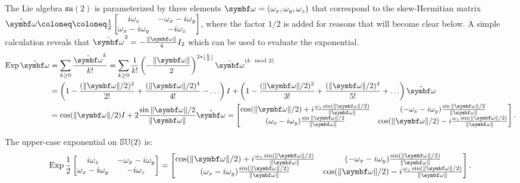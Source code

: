 The Lie algebra $\mathfrak{su}(2)$ is parameterized by three elements $\bomega = (\omega_x, \omega_y, \omega_z)$ that correspond to the skew-Hermitian matrix $\hat \bomega \coloneq \coloneq \frac{1}{{2}} \begin{bmatrix}
    i \omega_z            & -\omega_x - i \omega_y \\
    \omega_x - i \omega_y & -i \omega_z
  \end{bmatrix}$, where the factor $1/2$ is added for reasons that will become clear below. A simple calculation reveals that $\hat \bomega^2 =  -\frac{\| \bomega \|}{4} I_2$ which can be used to evaluate the exponential.
\begin{equation*}
  \begin{aligned}
    \Exp \hat \bomega
     & = \sum_{k \geq 0} \frac{\hat \bomega^k}{k!} = \sum_{k \geq 0} \frac{1}{k!} \left(-\frac{\| \bomega \|}{2} \right)^{2 * \lfloor \frac{k}{2} \rfloor} \hat \bomega^{(k \mod 2)}                      \\
     & = \left( 1 - \frac{(\|\bomega\|/2)^2}{2!} + \frac{(\|\bomega\|/2)^4}{4!} - \ldots \right) I + \left( 1 - \frac{(\|\bomega\|/2)^2}{3!} + \frac{(\|\bomega\|/2)^4}{5!} + \ldots \right) \hat \bomega \\
     & = \cos (\|\bomega\| / 2) I + 2 \frac{\sin \|\bomega\| / 2}{\|\bomega\|} \hat \bomega = \begin{bmatrix}
      \cos(\|\bomega\| / 2) + i \frac{\omega_z \sin (\|\bomega\|/2) }{\|\bomega\|} & (-\omega_x - i \omega_y) \frac{\sin \|\bomega\|/2}{\|\bomega\|}              \\
      (\omega_x - i \omega_y) \frac{\sin \|\bomega\|/2}{\|\bomega\|}               & \cos(\|\bomega\| / 2) - i \frac{\omega_z \sin (\|\bomega\|/2) }{\|\bomega\|}
    \end{bmatrix}.
  \end{aligned}
\end{equation*}
\begin{important}
  The upper-case exponential on ${\mathbb{SU}(2)}$ is:
  \begin{equation}
    \Exp\frac{1}{{2}} \begin{bmatrix}
      i \omega_z            & -\omega_x - i \omega_y \\
      \omega_x - i \omega_y & -i \omega_z
    \end{bmatrix} =  \begin{bmatrix}
      \cos(\| \bomega \| / 2) + i \frac{\omega_z \sin (\| \bomega \|/2) }{\| \bomega \|} & (-\omega_x - i \omega_y) \frac{\sin (\| \bomega \|/2)}{\| \bomega \|}              \\
      (\omega_x - i \omega_y) \frac{\sin (\| \bomega \|/2)}{\| \bomega \|}               & \cos(\| \bomega \| / 2) - i \frac{\omega_z \sin (\| \bomega \|/2) }{\| \bomega \|}
    \end{bmatrix}.
  \end{equation}
\end{important}

